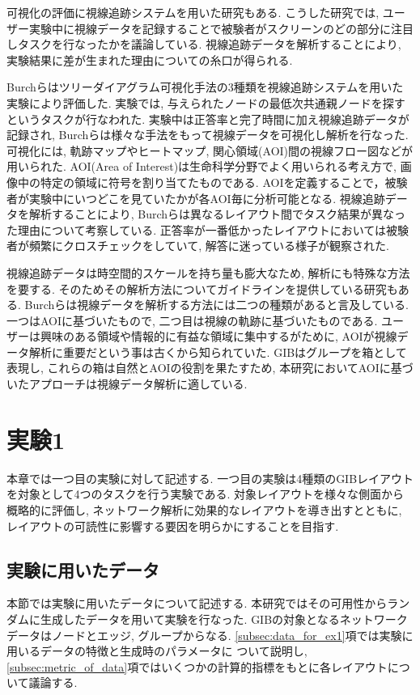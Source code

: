 \documentclass{kuee}
\begin{document}
可視化の評価に視線追跡システムを用いた研究もある\cite{burch2011evaluation,pohl2009comparing,netzel2014comparative,jianu2014display,7539393}.
こうした研究では, ユーザー実験中に視線データを記録することで被験者がスクリーンのどの部分に注目しタスクを行なったかを議論している.
視線追跡データを解析することにより, 実験結果に差が生まれた理由についての糸口が得られる.

Burchらはツリーダイアグラム可視化手法の3種類を視線追跡システムを用いた実験により評価した\cite{burch2011evaluation}.
実験では, 与えられたノードの最低次共通親ノードを探すというタスクが行なわれた.
実験中は正答率と完了時間に加え視線追跡データが記録され, Burchらは様々な手法をもって視線データを可視化し解析を行なった.
可視化には, 軌跡マップやヒートマップ, 関心領域(AOI)間の視線フロー図などが用いられた.
AOI(Area of Interest)は生命科学分野でよく用いられる考え方で, 画像中の特定の領域に符号を割り当てたものである.
AOIを定義することで，被験者が実験中にいつどこを見ていたかが各AOI毎に分析可能となる.
視線追跡データを解析することにより, Burchらは異なるレイアウト間でタスク結果が異なった理由について考察している.
正答率が一番低かったレイアウトにおいては被験者が頻繁にクロスチェックをしていて, 解答に迷っている様子が観察された.

視線追跡データは時空間的スケールを持ち量も膨大なため, 解析にも特殊な方法を要する.
そのためその解析方法についてガイドラインを提供している研究もある\cite{andrienko2012visual,kurzhals2014evaluating,duchowski2007eye}.
Burchらは視線データを解析する方法には二つの種類があると言及している\cite{Burch2013VisualTS}.
一つはAOIに基づいたもので, 二つ目は視線の軌跡に基づいたものである.
ユーザーは興味のある領域や情報的に有益な領域に集中するがために, AOIが視線データ解析に重要だという事は古くから知られていた\cite{yarbus1967eye}.
GIBはグループを箱として表現し, これらの箱は自然とAOIの役割を果たすため, 本研究においてAOIに基づいたアプローチは視線データ解析に適している.


\chapter{実験1}
\label{chap:experiment1}
本章では一つ目の実験に対して記述する.
一つ目の実験は4種類のGIBレイアウトを対象として4つのタスクを行う実験である.
対象レイアウトを様々な側面から概略的に評価し, ネットワーク解析に効果的なレイアウトを導き出すとともに, レイアウトの可読性に影響する要因を明らかにすることを目指す.

\section{実験に用いたデータ}
\label{sec:data}
本節では実験に用いたデータについて記述する.
本研究ではその可用性からランダムに生成したデータを用いて実験を行なった.
GIBの対象となるネットワークデータはノードとエッジ, グループからなる.
\ref{subsec:data_for_ex1}項では実験に用いるデータの特徴と生成時のパラメータに
ついて説明し, \ref{subsec:metric_of_data}項ではいくつかの計算的指標をもとに各レイアウトについて議論する.
\end{document}
